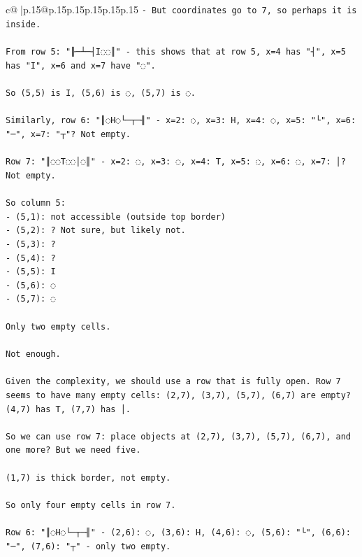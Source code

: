 \documentclass{article}
\begin{document}
{\begin{supertabular}{c@{$\;$}|p{.15\linewidth}@{}p{.15\linewidth}p{.15\linewidth}p{.15\linewidth}p{.15\linewidth}p{.15\linewidth}}
{{{\texttt{{-} But coordinates go to 7, so perhaps it is inside.} \\
\\ 
\texttt{From row 5: "╟─┴─┤I◌◌║" {-} this shows that at row 5, x=4 has "┤", x=5 has "I", x=6 and x=7 have "◌".} \\
\\ 
\texttt{So (5,5) is I, (5,6) is ◌, (5,7) is ◌.} \\
\\ 
\texttt{Similarly, row 6: "║◌H◌└─┬─╢" {-} x=2: ◌, x=3: H, x=4: ◌, x=5: "└", x=6: "─", x=7: "┬"? Not empty.} \\
\\ 
\texttt{Row 7: "║◌◌T◌◌│◌║" {-} x=2: ◌, x=3: ◌, x=4: T, x=5: ◌, x=6: ◌, x=7: │? Not empty.} \\
\\ 
\texttt{So column 5: } \\
\texttt{{-} (5,1): not accessible (outside top border)} \\
\texttt{{-} (5,2): ? Not sure, but likely not.} \\
\texttt{{-} (5,3): ? } \\
\texttt{{-} (5,4): ?} \\
\texttt{{-} (5,5): I} \\
\texttt{{-} (5,6): ◌} \\
\texttt{{-} (5,7): ◌} \\
\\ 
\texttt{Only two empty cells.} \\
\\ 
\texttt{Not enough.} \\
\\ 
\texttt{Given the complexity, we should use a row that is fully open. Row 7 seems to have many empty cells: (2,7), (3,7), (5,7), (6,7) are empty? (4,7) has T, (7,7) has │.} \\
\\ 
\texttt{So we can use row 7: place objects at (2,7), (3,7), (5,7), (6,7), and one more? But we need five.} \\
\\ 
\texttt{(1,7) is thick border, not empty.} \\
\\ 
\texttt{So only four empty cells in row 7.} \\
\\ 
\texttt{Row 6: "║◌H◌└─┬─╢" {-} (2,6): ◌, (3,6): H, (4,6): ◌, (5,6): "└", (6,6): "─", (7,6): "┬" {-} only two empty.} \\
\\ 
}}}
\end{supertabular}}
\end{document}
